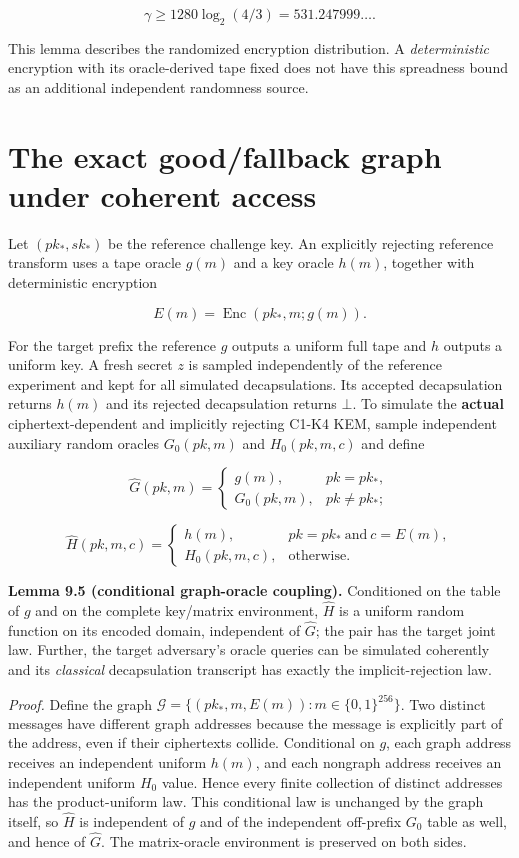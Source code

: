 \documentclass[
  11pt,
  a4paper,
  oneside]{report}
\begin{document}
\[
\gamma\ge1280\log_2(4/3)
=531.247999\ldots.
\]

This lemma describes the randomized encryption distribution. A
\emph{deterministic} encryption with its oracle-derived tape fixed does
not have this spreadness bound as an additional independent randomness
source.

\section{The exact good/fallback graph under coherent
access}\label{the-exact-goodfallback-graph-under-coherent-access}

Let \((pk_*,sk_*)\) be the reference challenge key. An explicitly
rejecting reference transform uses a tape oracle \(g(m)\) and a key
oracle \(h(m)\), together with deterministic encryption

\[
E(m)=\operatorname{Enc}(pk_*,m;g(m)).
\]

For the target prefix the reference \(g\) outputs a uniform full tape
and \(h\) outputs a uniform key. A fresh secret \(z\) is sampled
independently of the reference experiment and kept for all simulated
decapsulations. Its accepted decapsulation returns \(h(m)\) and its
rejected decapsulation returns \(\bot\). To simulate the \textbf{actual}
ciphertext-dependent and implicitly rejecting C1-K4 KEM, sample
independent auxiliary random oracles \(G_0(pk,m)\) and \(H_0(pk,m,c)\)
and define

\[
\widehat G(pk,m)=
\begin{cases}
 g(m),&pk=pk_*,\\
 G_0(pk,m),&pk\neq pk_*;
\end{cases}
\]

\[
\widehat H(pk,m,c)=
\begin{cases}
 h(m),&pk=pk_*\ \text{and}\ c=E(m),\\
 H_0(pk,m,c),&\text{otherwise}.
\end{cases}
\]

\textbf{Lemma 9.5 (conditional graph-oracle coupling).} Conditioned on
the table of \(g\) and on the complete key/matrix environment,
\(\widehat H\) is a uniform random function on its encoded domain,
independent of \(\widehat G\); the pair has the target joint law.
Further, the target adversary's oracle queries can be simulated
coherently and its \emph{classical} decapsulation transcript has exactly
the implicit-rejection law.

\emph{Proof.} Define the graph
\(\mathcal G=\{(pk_*,m,E(m)):m\in\{0,1\}^{256}\}\). Two distinct
messages have different graph addresses because the message is
explicitly part of the address, even if their ciphertexts collide.
Conditional on \(g\), each graph address receives an independent uniform
\(h(m)\), and each nongraph address receives an independent uniform
\(H_0\) value. Hence every finite collection of distinct addresses has
the product-uniform law. This conditional law is unchanged by the graph
itself, so \(\widehat H\) is independent of \(g\) and of the independent
off-prefix \(G_0\) table as well, and hence of \(\widehat G\). The
matrix-oracle environment is preserved on both sides.
\end{document}
